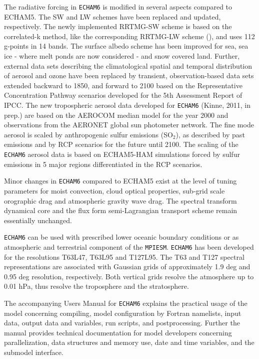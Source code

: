 \documentclass[DIV14,BCOR1cm,11pt,a4paper,twoside]{scrreprt}
\newcommand{\echam}{\color{black}\texttt{ECHAM6}\color{black}}
\newcommand{\mpiesm}{\color{black}\texttt{MPIESM}\color{black}}
\begin{document}
The radiative forcing in \echam{} is modified in several aspects compared to ECHAM5. The SW and LW schemes have been replaced and updated, respectively. The newly implemented RRTMG-SW scheme is based on the correlated-k method, like the corresponding RRTMG-LW scheme (\cite{iacono2008}), and uses 112 g-points in 14 bands. The surface albedo scheme has been improved for sea, sea ice - where melt ponds are now considered - and snow covered land. Further, external data sets describing the climatological spatial and temporal distribution of aerosol and ozone have been replaced by transient, observation-based data sets extended backward to 1850, and forward to 2100 based on the Representative Concentration Pathway scenarios developed for the 5th Assessment Report of IPCC. The new tropospheric aerosol data developed for \echam{} (Kinne, 2011, in prep.) are based on the AEROCOM median model for the year 2000 and observations from the AERONET global sun photometer network. The fine mode aerosol is scaled by anthropogenic sulfur emissions (SO$_{2}$), as described by past emissions and by RCP scenarios for the future until 2100. The scaling of the \echam{} aerosol data is based on ECHAM5-HAM simulations forced by sulfur emissions in 5 major regions differentiated in the RCP scenarios.

Minor changes in \echam{} compared to ECHAM5 exist at the level of tuning parameters for moist convection, cloud optical properties, sub-grid scale orographic drag and atmospheric gravity wave drag. The spectral transform dynamical core and the flux form semi-Lagrangian transport scheme remain essentially unchanged. 

\echam{} can be used with prescribed lower oceanic boundary conditions or as atmospheric and terrestrial component of the \mpiesm{}. \echam{} has been developed for the resolutions T63L47, T63L95 and T127L95. The T63 and T127 spectral representations are associated with Gaussian grids of approximately 1.9 deg and 0.95 deg resolution, respectively. Both vertical grids resolve the atmosphere up to 0.01 hPa, thus resolve the troposphere and the stratosphere. 

The accompanying Users Manual for \echam{} explains the practical usage of the model concerning compiling, model configuration by Fortran namelists, input data, output data and variables, run scripts, and postprocessing. Further the manual provides technical documentation for model developers concerning parallelization, data structures and memory use, date and time variables, and the submodel interface.
\end{document}
